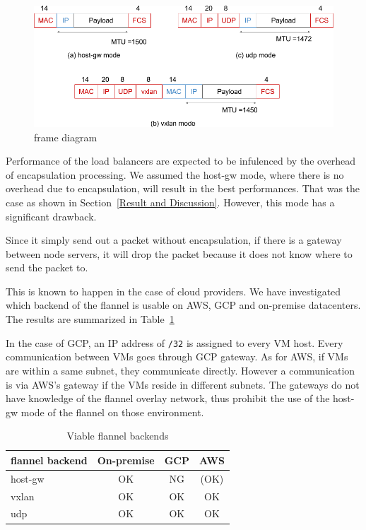 \begin{figure}
\includegraphics[width=\columnwidth]{Figs/flannel-packet-diagram}
\caption{frame diagram}
\label{fig:flannel-packet-diagram}
\end{figure}

Performance of the load balancers are expected to be infulenced by the overhead of encapsulation processing.
We assumed the host-gw mode, where there is no overhead due to encapsulation, will result in the best performances.
That was the case as shown in Section~\ref{Result and Discussion}.
However, this mode has a significant drawback.

Since it simply send out a packet without encapsulation, 
if there is a gateway between node servers, 
it will drop the packet because it does not know where to send the packet to.

This is known to happen in the case of cloud providers.  
We have investigated which backend of the flannel is usable on AWS, GCP and on-premise datacenters.
The results are summarized in Table~\ref{tab:Viable flannel backends}

In the case of GCP, an IP address of {\tt /32} is assigned to every VM host.
Every communication between VMs goes through GCP gateway.
As for AWS, if VMs are within a same subnet, they communicate directly.
However a communication is via AWS's gateway if the VMs reside in different subnets.
The gateways do not have knowledge of the flannel overlay network, 
thus prohibit the use of the host-gw mode of the flannel on those environment.  

\begin{table}
  \begin{tabular}{lccc}
    \toprule
    flannel backend & On-premise & GCP & AWS \\
    \midrule
    host-gw & OK & NG & (OK) \\
    vxlan & OK & OK & OK \\
    udp & OK & OK & OK \\
    \bottomrule
\end{tabular}
  \caption{Viable flannel backends}
  \label{tab:Viable flannel backends}
\end{table}

